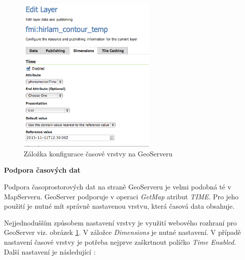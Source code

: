 \begin{figure}[h!]  \centering
\includegraphics[width=0.6\textwidth]{./img/geoserver-layer-edit.png}
	\caption{Záložka konfigurace časové vrstvy na GeoServeru
\cite{geoserver-layer-edit}}
	\label{fig:geoserver-layer-edit}
\end{figure}

\bigskip
\noindent

\textbf{Podpora časových dat}

Podpora časoprostorových dat na straně GeoServeru je velmi podobná té v
MapServeru. GeoServer podporuje v operaci \textit{GetMap} atribut
\textit{TIME}. Pro jeho použití je nutné mít správně nastavenou
vrstvu, která časová data obsahuje.

Nejjednodušším způsobem nastavení vrstvy je využití webového rozhraní
pro Geo\-Server viz. obrázek \ref{fig:geoserver-layer-edit}. V záložce \textit{Dimensions} je
nutné nastavení. V případě nastavení časové vrstvy je potřeba nejprve
zaškrtnout políčko \textit{Time Enabled}. Další nastavení je
následující \cite{geoserver-layer-edit}:


